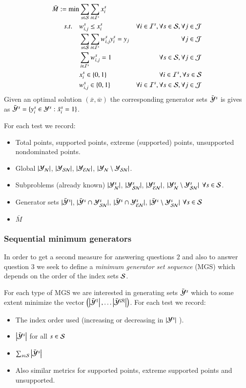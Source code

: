 \begin{enumerate}
\begin{align*}
	\bar{M}  := \min&  \sum_{s \in \S}\sum_{i \in \I^s} x^s_i \\
	s.t. \quad & w^s_{i,j} \le x^s_i & \forall i \in \I^s, \forall s \in \S, \forall j \in \J \\
		   &\sum_{s \in \S}\sum_{i \in \I^s} w^s_{i,j} y^s_i = y_j & \quad \forall j \in \J \\
		   &\sum_{i \in \I^s} w^s_{i,j} = 1 & \quad \forall s \in \S, \forall j \in \J  \\
		   & x^s_i \in \{0,1\} & \forall i \in \I^s, \forall s \in \S\\
		   & w^s_{i,j} \in \{0,1\} &\forall i \in \I^s, \forall s \in \S, \forall j \in \J \nonumber
\end{align*}
Given an optimal solution $(\bar{x},\bar{w})$ the corresponding generator sets $\Ycs$ is gives as $\Ycs = \{ y^s_i \in \Y^s : \bar{x}^s_i = 1\}$.

For each test we record:
\begin{itemize}
	\item Total points, supported points, extreme (supported) points, unsupported nondominated points.
	\item Global $\lvert \Yn \rvert$, $\lvert \Ysn \rvert$,  $\lvert \Yen \rvert$, $\lvert \Yn \setminus \Ysn \rvert$.
	\item Subproblems (already known)  $\lvert \Yn^s \rvert$, $\lvert \Ysn^s \rvert$,  $\lvert \Yen^s \rvert$, $\lvert \Yn^s \setminus \Ysn^s \rvert$ $\forall s \in \S$.
	\item Generator sets $\lvert \Ycs \rvert$, $\lvert \Ycs \cap \Ysn^s \rvert$, $\lvert \Ycs \cap \Yen^s \rvert$,  $\lvert \Ycs \setminus \Ysn^s \rvert$  $\forall s \in \S$
	\item $\bar{M}$
\end{itemize}





\subsubsection{Sequential minimum generators}
In order to get a second measure for answering questions $2$ and also to answer question $3$ we seek to define a \emph{minimum generator set sequence} (MGS) which depends on the order of the index sets $\S$.

For each type of MGS we are interested in generating sets $\bY^s$ which to some extent minimize the vector $ \left(\abs{\bY^1}, \hdots \abs{\bY^{\abs{\S}}}\right) $. For each test we record:
\begin{itemize}
        \item The index order used (\eg increasing or decreasing in  $\abs{\Y^s}$ ).
	\item $\abs{\bY^s}$ for all $s \in \S$
	\item $\sum_{s \in \S} \abs{\bY^s} $
	\item Also similar metrics for supported points, extreme supported points and unsupported.
\end{itemize}



\end{enumerate}

